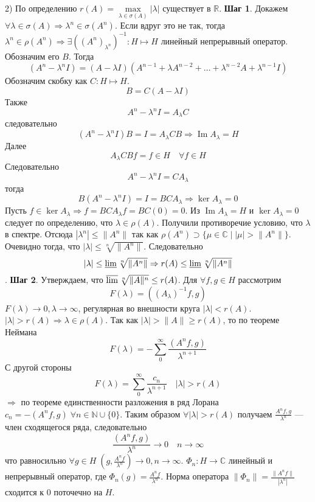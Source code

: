 \documentclass[12pt]{article}
\renewcommand{\Im}{\operatorname{Im}}
\newcommand{\Al}{A_\lambda}
\newcommand{\Alo}{(\Al)^{-1}}
\begin{document}
\begin{Proof}
    2) По определению $r(A) = \max\limits_{\lambda \in \sigma(A)} |\lambda|$ существует в $\mathbb R$.
    \textbf{Шаг 1}.
    Докажем $\forall \lambda \in \sigma(A) \Rightarrow \lambda^n \in \sigma(A^n)$. 
    Если вдруг это не так, тогда $\lambda^n \in \rho(A^n) \Rightarrow \exists ((A^n)_{\lambda^n})^{-1} : H \mapsto H$ линейный непрерывный оператор. 
    Обозначим его $B$. 
    Тогда
    $$
    (A^n - \lambda^n I) = (A - \lambda I)(A^{n - 1} + \lambda A^{n - 2} + \dots + \lambda^{n - 2} A + \lambda^{n - 1} I)
    $$
    Обозначим скобку как $C : H \mapsto H$.
    $$
    B = C(A - \lambda I)
    $$
    Также
    $$
    A^n - \lambda^n I = \Al C
    $$
    следовательно 
    $$
    (A^n - \lambda^n I) B = I = \Al C B \Rightarrow \Im \Al = H
    $$
    Далее 
    $$
    \Al CBf = f \in H\quad \forall f \in H
    $$
    Следовательно
    $$
    A^n - \lambda^n I = C\Al
    $$
    тогда
    $$
    B(A^n - \lambda^n I) = I = B C \Al \Rightarrow \ker \Al = 0
    $$
    Пусть $f \in \ker \Al \Rightarrow f = B C \Al f = B C(0) = 0$.
    Из $\Im \Al = H$ и $\ker \Al = 0$ следует по определению, что $\lambda \in \rho(A)$.
    Получили противоречие условию, что $\lambda$ в спектре.
    Отсюда $|\lambda^n| \le \|A^n\|$ так как $\rho(A^n) \supset \{\mu \in \mathbb C \mid |\mu| > \|A^n\|\}$.
    Очевидно тогда, что $|\lambda| \le \sqrt[n]{\|A^n\|}$.
    Следовательно
    $$
    |\lambda| \le \varliminf \sqrt[n]{\|A^n\|} \Rightarrow r(A) \le \varliminf \sqrt[n]{\|A^n\|}
    $$.
    \textbf{Шаг 2}.
    Утверждаем, что $\varlimsup \sqrt[n]{\|A\|^n} \le r(A)$.
    Для $\forall f, g \in H$ рассмотрим 
    $$
    F(\lambda) = (\Alo f, g)
    $$
    $F(\lambda) \to 0, \lambda \to \infty$, регулярная во внешности круга $|\lambda| < r(A)$.
    $|\lambda| > r(A) \Rightarrow \lambda \in \rho(A)$. Так как $|\lambda| > \|A\| \ge r(A)$, то по теореме Неймана
    $$
    F(\lambda) = - \sum_0^\infty \frac{(A^n f, g)}{\lambda^{n + 1}}
    $$
    С другой стороны
    $$F(\lambda) = \sum_0^\infty \frac{c_n}{\lambda^{n + 1}}\quad |\lambda|>r(A)
    $$
    $\Rightarrow$ по теореме единственности разложения в ряд Лорана
    $c_n = - (A^n f, g)\;\forall n \in \mathbb N \cup \{0\}$.
    Таким образом $\forall |\lambda| > r(A)$ получаем $\frac{A^n f, g}{\lambda^n}$ --- член сходящегося ряда, следовательно
    $$
    \frac{(A^n f, g)}{\lambda^n} \to 0\quad n \to \infty
    $$
    что равносильно $\forall g \in H\;(g, \frac{A^n f}{\lambda^n}) \to 0, n \to \infty$.
    $\Phi_n : H \to \mathbb C$ линейный и непрерывный оператор, где $\Phi_n(g) = \frac{A^n f}{\lambda^n}$.
    Норма оператора
    $\|\Phi_n\| = \frac {\|A^n f\|}{|\lambda^n|}$ сходится к 0 поточечно на $H$.

\end{Proof}
\end{document}
